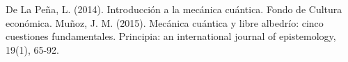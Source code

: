 \renewcommand{\refname}{Bibliografía}
\begin{thebibliography}{2}
 De La Peña, L. (2014). Introducción a la mecánica cuántica. Fondo de Cultura económica.
 Muñoz, J. M. (2015). Mecánica cuántica y libre albedrío: cinco cuestiones fundamentales. Principia: an international journal of epistemology, 19(1), 65-92.
\end{thebibliography}